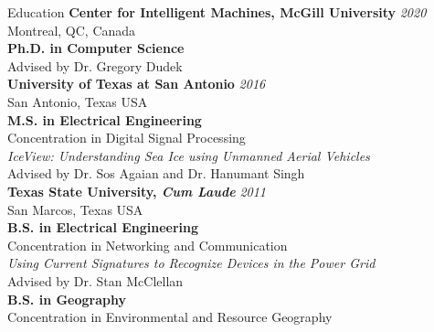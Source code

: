 \documentclass{resume} %
\begin{document}

\begin{rSection}{Education}
{\bf Center for Intelligent Machines, McGill University} \hfill {\em 2020} \\ 
Montreal, QC, Canada \\
{\bf Ph.D. in Computer Science} \\
Advised by Dr. Gregory Dudek \smallskip \\

{\bf University of Texas at San Antonio} \hfill {\em 2016} \\ 
San Antonio, Texas USA \\
{\bf M.S. in Electrical Engineering} \\
Concentration in Digital Signal Processing \\
\textit{IceView: Understanding Sea Ice using Unmanned Aerial Vehicles} \\ 
Advised by Dr. Sos Agaian and Dr. Hanumant Singh \smallskip \\

{\bf Texas State University, \textit{Cum Laude}} \hfill {\em 2011} \\ 
San Marcos, Texas USA \\
{\bf B.S. in Electrical Engineering} \\
Concentration in Networking and Communication  \\
\textit{Using Current Signatures to Recognize Devices in the Power Grid}  \\
Advised by Dr. Stan McClellan  \smallskip \\ 
{\bf B.S. in Geography} \\
Concentration in Environmental and Resource Geography \\
\end{rSection}

\end{document}
